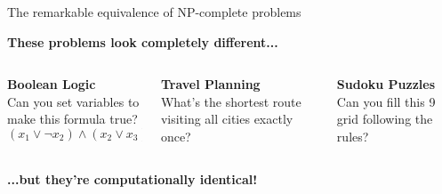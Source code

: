 \documentclass[aspectratio=169, lualatex, handout]{beamer}
\begin{document}
\begin{frame}{The remarkable equivalence of NP-complete problems}
	\begin{center}
		\Large\textbf{These problems look completely different...}
		\vspace{0.5cm}

		\begin{columns}[c]
			\begin{column}{0.33\textwidth}
				\textbf{Boolean Logic}\\
				\small Can you set variables to make this formula true?\\
				$(x_1 \lor \neg x_2) \land (x_2 \lor x_3) \land \ldots$
			\end{column}
			\begin{column}{0.33\textwidth}
				\textbf{Travel Planning}\\
				\small What's the shortest route visiting all cities exactly once?
			\end{column}
			\begin{column}{0.33\textwidth}
				\textbf{Sudoku Puzzles}\\
				\small Can you fill this 9  grid following the rules?
			\end{column}
		\end{columns}
		\vspace{0.5cm}

		\Large\textbf{...but they're computationally identical!}
	\end{center}
\end{frame}
\end{document}
